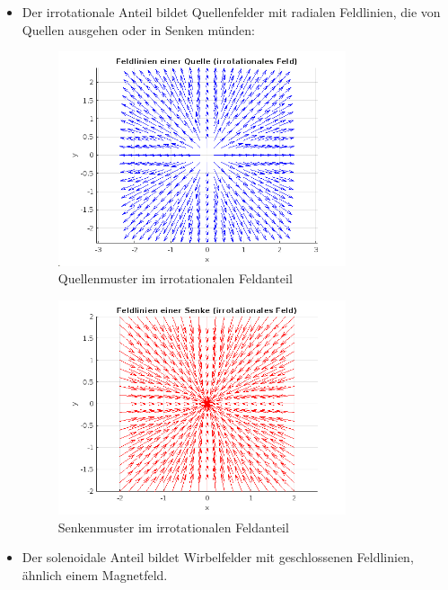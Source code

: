 \begin{itemize}
\item Der irrotationale Anteil bildet Quellenfelder mit radialen Feldlinien, die von Quellen ausgehen oder in Senken münden:
 
\begin{figure}
\centering
\includegraphics[width=0.8\textwidth]{papers/helmholtz/images/Quelle.png}
\caption{Quellenmuster im irrotationalen Feldanteil}
\label{fig:quelle}
\end{figure}
 
\begin{figure}
\centering
\includegraphics[width=0.8\textwidth]{papers/helmholtz/images/Senke.png}
\caption{Senkenmuster im irrotationalen Feldanteil}
\label{fig:senke}
\end{figure}
 
\item Der solenoidale Anteil bildet Wirbelfelder mit geschlossenen Feldlinien, ähnlich einem Magnetfeld.
\end{itemize}
  
